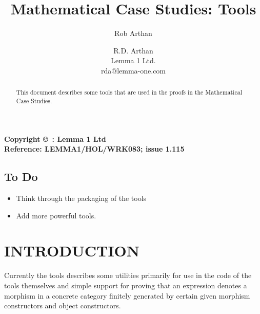 \documentclass[11pt,a4paper]{article}
\title{Mathematical Case Studies: Tools}
\author{Rob Arthan}
\author{R.D. Arthan \\ Lemma 1 Ltd. \\ rda@lemma-one.com}
\date{\FormatDate{$Date: 2012/06/05 12:35:44 $%
}}
\begin{document}
\begin{titlepage}
\maketitle
\begin{abstract}

This document describes some tools that are used in the proofs in the {\Product} Mathematical Case Studies.
\end{abstract}
\vfill
\begin{centering}

\bf Copyright \copyright\ : Lemma 1 Ltd \number\year \\
Reference: LEMMA1/HOL/WRK083; issue 1.115%


\end{centering}
\thispagestyle{empty}
\end{titlepage}
\newpage
\addtocounter{page}{1}
\tableofcontents
\newpage
\subsection*{To Do}
\begin{itemize}

\item
Think through the packaging of the tools
\item
Add more powerful tools.
\end{itemize}





\newpage
\section{INTRODUCTION}
Currently the tools describes some utilities primarily for use in the code of the tools themselves and simple support for proving that an expression denotes a morphism in a concrete category finitely generated by certain given morphism constructors and object constructors.
\end{document}

